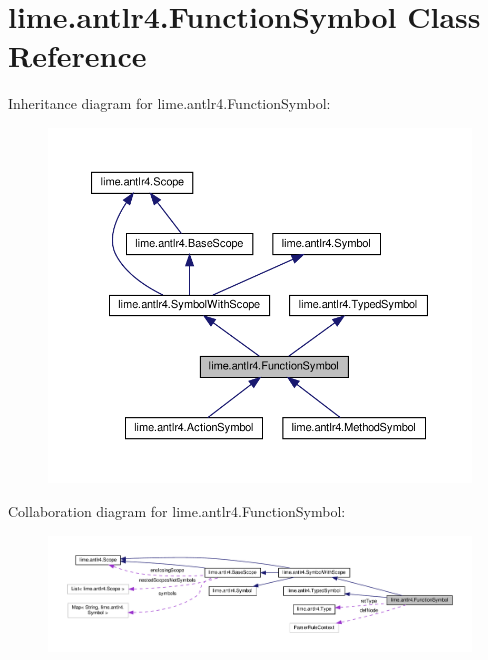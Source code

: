 \hypertarget{classlime_1_1antlr4_1_1FunctionSymbol}{}\section{lime.\+antlr4.\+Function\+Symbol Class Reference}
\label{classlime_1_1antlr4_1_1FunctionSymbol}


Inheritance diagram for lime.\+antlr4.\+Function\+Symbol\+:
\nopagebreak
\begin{figure}[H]
\begin{center}
\leavevmode
\includegraphics[width=350pt]{classlime_1_1antlr4_1_1FunctionSymbol__inherit__graph}
\end{center}
\end{figure}


Collaboration diagram for lime.\+antlr4.\+Function\+Symbol\+:
\nopagebreak
\begin{figure}[H]
\begin{center}
\leavevmode
\includegraphics[width=350pt]{classlime_1_1antlr4_1_1FunctionSymbol__coll__graph}
\end{center}
\end{figure}
